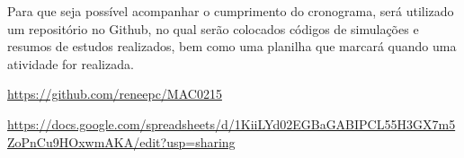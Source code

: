 \documentclass{article}
\begin{document}
Para que seja possível acompanhar o cumprimento do cronograma, será utilizado um repositório no Github, no qual serão
colocados códigos de simulações e resumos de estudos realizados, bem como uma planilha que marcará quando uma atividade
for realizada.

\url{https://github.com/reneepc/MAC0215}

\url{https://docs.google.com/spreadsheets/d/1KiiLYd02EGBaGABIPCL55H3GX7m5ZoPnCu9HOxwmAKA/edit?usp=sharing}
\end{document}

